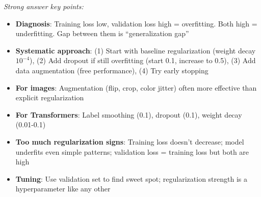 \documentclass[../../main.tex]{subfiles}
\begin{document}
\begin{interviewquestions}
\textit{Strong answer key points:}
\begin{itemize}
    \item \textbf{Diagnosis}: Training loss low, validation loss high = overfitting. Both high = underfitting. Gap between them is ``generalization gap''
    \item \textbf{Systematic approach}: (1) Start with baseline regularization (weight decay $10^{-4}$), (2) Add dropout if still overfitting (start 0.1, increase to 0.5), (3) Add data augmentation (free performance), (4) Try early stopping
    \item \textbf{For images}: Augmentation (flip, crop, color jitter) often more effective than explicit regularization
    \item \textbf{For Transformers}: Label smoothing (0.1), dropout (0.1), weight decay (0.01-0.1)
    \item \textbf{Too much regularization signs}: Training loss doesn't decrease; model underfits even simple patterns; validation loss = training loss but both are high
    \item \textbf{Tuning}: Use validation set to find sweet spot; regularization strength is a hyperparameter like any other
\end{itemize}

\end{interviewquestions}
\end{document}
